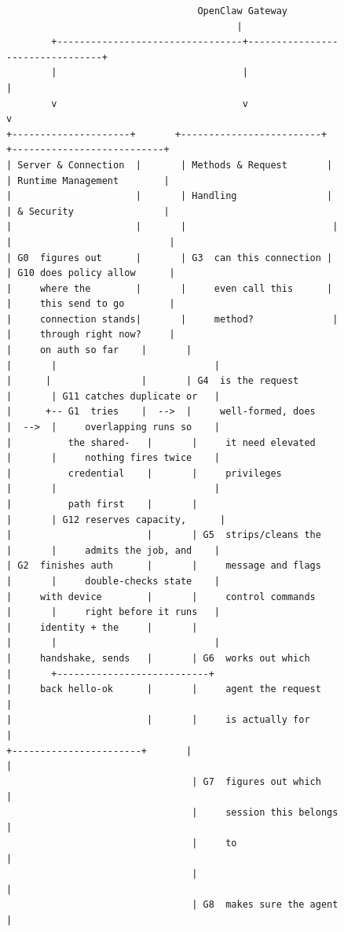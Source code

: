 \begin{figure}[p]
{\begin{verbatim}
                                  OpenClaw Gateway
                                         |
        +---------------------------------+---------------------------------+
        |                                 |                                 |
        v                                 v                                 v
+---------------------+       +-------------------------+       +---------------------------+
| Server & Connection  |       | Methods & Request       |       | Runtime Management        |
|                      |       | Handling                |       | & Security                |
|                      |       |                          |       |                            |
| G0  figures out      |       | G3  can this connection |       | G10 does policy allow      |
|     where the        |       |     even call this      |       |     this send to go        |
|     connection stands|       |     method?              |       |     through right now?     |
|     on auth so far    |       |                          |       |                            |
|      |                |       | G4  is the request       |       | G11 catches duplicate or   |
|      +-- G1  tries    |  -->  |     well-formed, does    |  -->  |     overlapping runs so    |
|          the shared-   |       |     it need elevated     |       |     nothing fires twice    |
|          credential    |       |     privileges           |       |                            |
|          path first    |       |                          |       | G12 reserves capacity,      |
|                        |       | G5  strips/cleans the    |       |     admits the job, and    |
| G2  finishes auth      |       |     message and flags    |       |     double-checks state    |
|     with device        |       |     control commands     |       |     right before it runs   |
|     identity + the     |       |                          |       |                            |
|     handshake, sends   |       | G6  works out which      |       +---------------------------+
|     back hello-ok      |       |     agent the request     |
|                        |       |     is actually for       |
+-----------------------+       |                            |
                                 | G7  figures out which      |
                                 |     session this belongs   |
                                 |     to                     |
                                 |                            |
                                 | G8  makes sure the agent   |

\end{verbatim}}
\end{figure}
